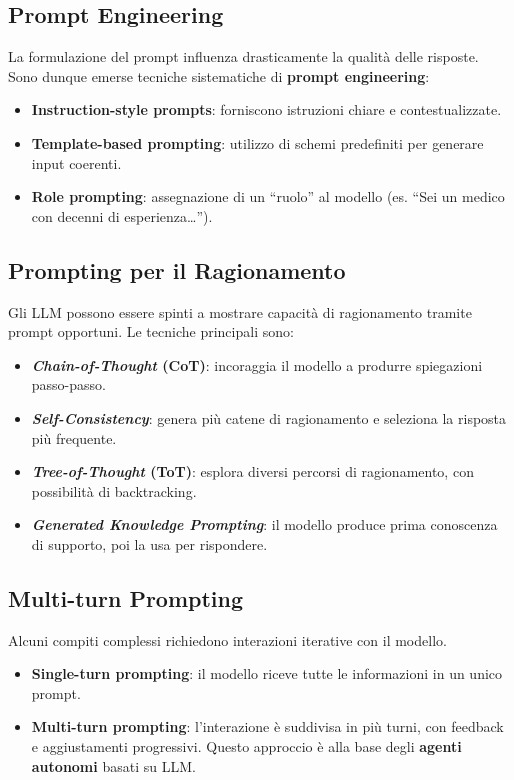 \subsection{Prompt Engineering}
La formulazione del prompt influenza drasticamente la qualità delle risposte.
Sono dunque emerse tecniche sistematiche di \textbf{prompt engineering}:
\begin{itemize}
    \item \textbf{Instruction-style prompts}: forniscono istruzioni chiare e contestualizzate.
    \item \textbf{Template-based prompting}: utilizzo di schemi predefiniti per generare input coerenti.
    \item \textbf{Role prompting}: assegnazione di un “ruolo” al modello (es. “Sei un medico con decenni di esperienza…”).
\end{itemize}

\subsection{Prompting per il Ragionamento}
Gli LLM possono essere spinti a mostrare capacità di ragionamento tramite prompt opportuni.
Le tecniche principali sono:
\begin{itemize}
    \item \textbf{\textit{Chain-of-Thought} (CoT)}: incoraggia il modello a produrre spiegazioni passo-passo.
    \item \textbf{\textit{Self-Consistency}}: genera più catene di ragionamento e seleziona la risposta più frequente.
    \item \textbf{\textit{Tree-of-Thought} (ToT)}: esplora diversi percorsi di ragionamento, con possibilità di backtracking.
    \item \textbf{\textit{Generated Knowledge Prompting}}: il modello produce prima conoscenza di supporto, poi la usa per rispondere.
\end{itemize}

\subsection{Multi-turn Prompting}
Alcuni compiti complessi richiedono interazioni iterative con il modello.
\begin{itemize}
    \item \textbf{Single-turn prompting}: il modello riceve tutte le informazioni in un unico prompt.
    \item \textbf{Multi-turn prompting}: l'interazione è suddivisa in più turni, 
    con feedback e aggiustamenti progressivi. Questo approccio è alla base degli \textbf{agenti autonomi} basati su LLM.
\end{itemize}

